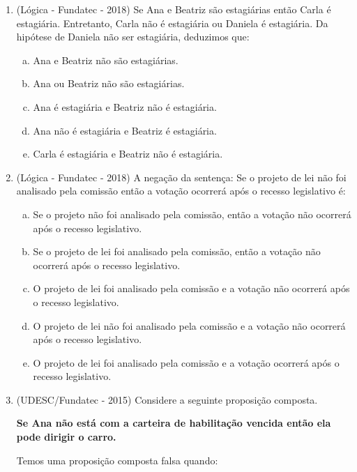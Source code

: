 \begin{enumerate}
\item (Lógica - Fundatec - 2018) Se Ana e Beatriz são estagiárias então Carla é estagiária. Entretanto, Carla não é estagiária ou Daniela é estagiária. Da hipótese de Daniela não ser estagiária, deduzimos que:
\begin{enumerate}[a)]
\item Ana e Beatriz não são estagiárias.
\item Ana ou Beatriz não são estagiárias.
\item Ana é estagiária e Beatriz não é estagiária.
\item Ana não é estagiária e Beatriz é estagiária.
\item Carla é estagiária e Beatriz não é estagiária.
\end{enumerate}

\item (Lógica - Fundatec - 2018) A negação da sentença: Se o projeto de lei não foi analisado pela comissão então a votação ocorrerá após o recesso legislativo é:
\begin{enumerate}[a)]
\item Se o projeto não foi analisado pela comissão, então a votação não ocorrerá após o recesso legislativo.
\item Se o projeto de lei foi analisado pela comissão, então a votação não ocorrerá após o recesso legislativo.
\item O projeto de lei foi analisado pela comissão e a votação não ocorrerá após o recesso legislativo.
\item O projeto de lei não foi analisado pela comissão e a votação não ocorrerá após o recesso legislativo.
\item O projeto de lei foi analisado pela comissão e a votação ocorrerá após o recesso legislativo.
\end{enumerate}

  \item (UDESC/Fundatec - 2015) Considere a seguinte proposição composta.
  
  \textbf{Se Ana não está com a carteira de habilitação vencida então ela pode dirigir o carro.}
  
  Temos uma proposição composta falsa quando:


\end{enumerate}
